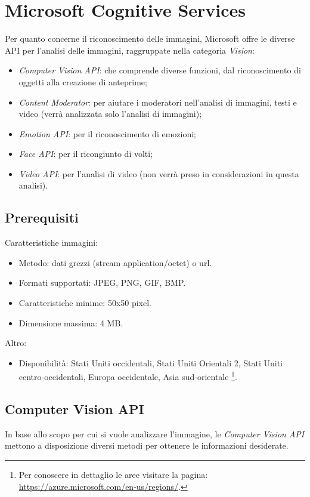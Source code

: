 
\section{Microsoft Cognitive Services}
Per quanto concerne il riconoscimento delle immagini, Microsoft offre le diverse API per l'analisi delle immagini, raggruppate nella categoria \textit{Vision}:
\begin{itemize}
\item \textit{Computer Vision API}: che comprende diverse funzioni, dal riconoscimento di oggetti alla creazione di anteprime;
\item \textit{Content Moderator}: per aiutare i moderatori nell'analisi di immagini, testi e video (verrà analizzata solo l'analisi di immagini);
\item \textit{Emotion API}: per il riconoscimento di emozioni;
\item \textit{Face API}: per il ricongiunto di volti;
\item \textit{Video API}: per l'analisi di video (non verrà preso in considerazioni in questa analisi).
\end{itemize}
%
\subsection{Prerequisiti}
Caratteristiche immagini:
\begin{itemize}
\item Metodo: dati grezzi (stream application/octet) o url.
\item Formati supportati: JPEG, PNG, GIF, BMP.
\item Caratteristiche minime: 50x50 pixel.
\item Dimensione massima: 4 MB.
\end{itemize}
Altro:
\begin{itemize}
\item Disponibilità: Stati Uniti occidentali, Stati Uniti Orientali 2, Stati Uniti centro-occidentali, Europa occidentale, Asia sud-orientale
\footnote{Per conoscere in dettaglio le aree visitare la pagina: \url{https://azure.microsoft.com/en-us/regions/}.}.
\end{itemize}
%
\subsection{Computer Vision API}
In base allo scopo per cui si vuole analizzare l'immagine, le \textit{Computer Vision API} \cite{microsoft-api} mettono a disposizione diversi metodi per ottenere le informazioni desiderate.

